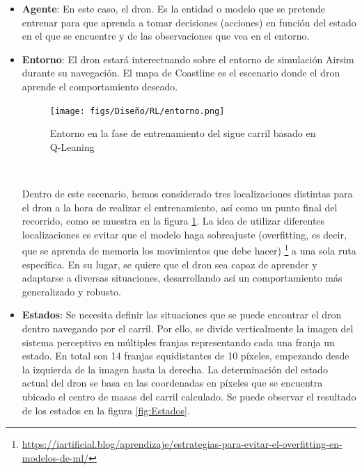   \begin{itemize} 
    \item \textbf{Agente}: En este caso, el dron. Es la entidad o modelo que se pretende entrenar para que aprenda a tomar decisiones (acciones) en función del estado en el que se 
    encuentre y de las observaciones que vea en el entorno. 
    
    \item \textbf{Entorno}: El dron estará interectuando sobre el entorno de simulación Airsim durante su navegación. El mapa de Coastline es el escenario donde el dron aprende 
    el comportamiento deseado. \newline

    \begin{figure} [H]
      \begin{center}
        \texttt{[image: figs/Diseño/RL/entorno.png]}
      \end{center}
      \caption{Entorno en la fase de entrenamiento del sigue carril basado en Q-Leaning}
      \label{fig:Entorno}
    \end{figure}\

    Dentro de este escenario, hemos considerado tres localizaciones distintas para el dron a la hora de realizar el entrenamiento, así como un punto final del recorrido, como se muestra en la figura
    \ref{fig:Entorno}. La idea de utilizar diferentes localizaciones es evitar que el modelo haga sobreajuste (overfitting, es decir, que se aprenda de memoria los movimientos que debe hacer)
    \footnote{\url{https://iartificial.blog/aprendizaje/estrategias-para-evitar-el-overfitting-en-modelos-de-ml/}} 
    a una sola ruta específica. En su lugar, se quiere que el dron 
    sea capaz de aprender y adaptarse a diversas situaciones, desarrollando así un comportamiento más generalizado y robusto.
    
    \item \textbf{Estados}: Se necesita definir las situaciones que se puede encontrar el dron dentro navegando por el carril. Por ello, se divide verticalmente la imagen del sistema perceptivo
    en múltiples franjas representando cada una franja un estado. En total son 14 franjas equidistantes de 10 píxeles, empezando desde la izquierda de la imagen hasta la derecha. La determinación
    del estado actual del dron se basa en las coordenadas en píxeles que se encuentra ubicado el centro de masas del carril calculado. Se puede observar el 
    resultado de los estados en la figura \ref{fig:Estados}. 
    

\end{itemize}

